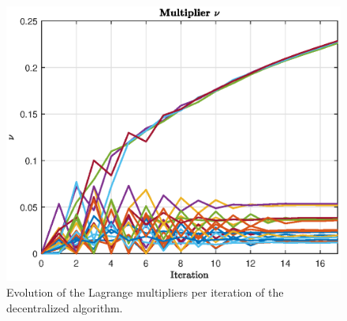 \begin{figure}[H]
\begin{minipage}{5.4cm}
        \includegraphics[width=\columnwidth]{figures/images/nu.eps}
    \end{minipage}
    \caption{Evolution of the Lagrange multipliers per iteration of the decentralized algorithm.}
    \label{fig:dec_multipliers}
\end{figure}